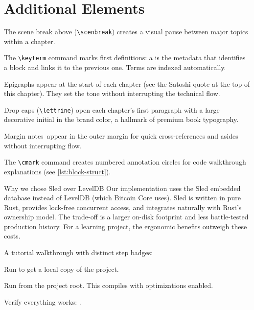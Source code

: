 \section{Additional Elements}

The scene break above (\texttt{\textbackslash scenbreak}) creates a
visual pause between major topics within a chapter.

The \texttt{\textbackslash keyterm} command marks first definitions:
a  is the metadata that identifies a block
and links it to the previous one. Terms are indexed automatically.

Epigraphs appear at the start of each chapter (see the Satoshi
quote at the top of this chapter). They set the tone without
interrupting the technical flow.

Drop caps (\texttt{\textbackslash lettrine}) open each chapter's
first paragraph with a large decorative initial in the brand color,
a hallmark of premium book typography.

Margin notes\ appear in the outer margin
for quick cross-references and asides without interrupting flow.

The \texttt{\textbackslash cmark} command creates numbered annotation
circles for code walkthrough explanations (see \cref{lst:block-struct}).


\begin{deepdive}{Why we chose Sled over LevelDB}
Our implementation uses the Sled embedded database instead of
LevelDB (which Bitcoin Core uses). Sled is written in pure Rust,
provides lock-free concurrent access, and integrates naturally
with Rust's ownership model. The trade-off is a larger on-disk
footprint and less battle-tested production history. For a
learning project, the ergonomic benefits outweigh these costs.
\end{deepdive}

A tutorial walkthrough with distinct step badges:

\begin{steps}
    Run 
    to get a local copy of the project.

    Run  from the project root.
    This compiles with optimizations enabled.

    Verify everything works: .
\end{steps}

